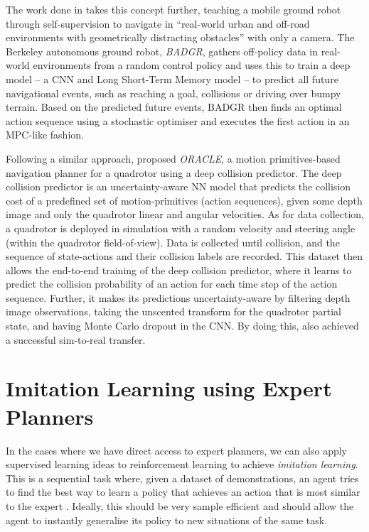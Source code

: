 The work done in \cite{Badgr} takes this concept further, teaching a mobile ground robot through self-supervision to navigate in ``real-world urban and off-road environments with geometrically distracting obstacles'' with only a camera. The Berkeley autonomous ground robot, \textit{BADGR}, gathers off-policy data in real-world environments from a random control policy and uses this to train a deep model -- a CNN and Long Short-Term Memory \cite{LSTM} model -- to predict all future navigational events, such as reaching a goal, collisions or driving over bumpy terrain. 
Based on the predicted future events, BADGR then finds an optimal action sequence using a stochastic optimiser \cite{BADGR_stochastic_optimiser} and executes the first action in an MPC-like fashion.

\begin{comment}
    Safe Visual Navigation via Deep Learning and Novelty Detection -- has a collision prediction network, trained from input action pairs -- uses an autoencoder for novelty detection, measures uncertainty in the network -- transitions between high-performance learned model and conservative simple prior.
\end{comment}

Following a similar approach, \cite{deepCollisionPredictorOracle} proposed \textit{ORACLE}, a motion primitives-based navigation planner for a quadrotor using a deep collision predictor. The deep collision predictor is an uncertainty-aware NN model that predicts the collision cost of a predefined set of motion-primitives (action sequences), given some depth image and only the quadrotor linear and angular velocities.
As for data collection, a quadrotor is deployed in simulation with a random velocity and steering angle  (within the quadrotor field-of-view). Data is collected until collision, and the sequence of state-actions and their collision labels are recorded. This dataset then allows the end-to-end training of the deep collision predictor, where it learns to predict the collision probability of an action for each time step of the action sequence. Further, it makes its predictions uncertainty-aware by filtering depth image observations, taking the unscented transform for the quadrotor partial state, and having Monte Carlo dropout in the CNN. By doing this, \cite{deepCollisionPredictorOracle} also achieved a successful sim-to-real transfer.

\section{Imitation Learning using Expert Planners}
\label{sec:3_imitation_learning}
In the cases where we have direct access to expert planners, we can also apply supervised learning ideas to reinforcement learning to achieve \textit{imitation learning}. This is a sequential task where, given a dataset of demonstrations, an agent tries to find the best way to learn a policy that achieves an action that is most similar to the expert \cite{imitationLearningOverview}. Ideally, this should be very sample efficient and should allow the agent to instantly generalise its policy to new situations of the same task.

